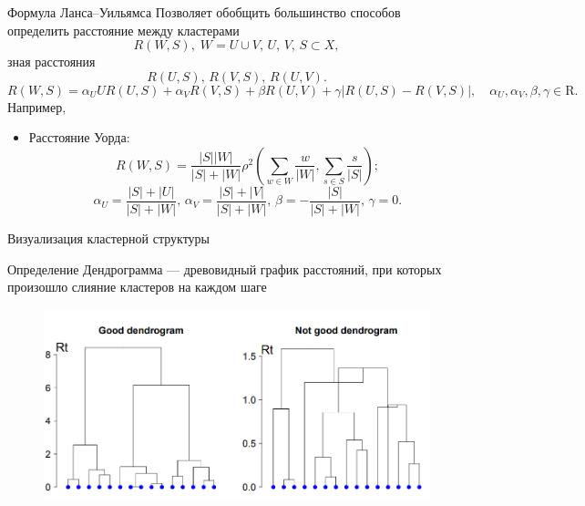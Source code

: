 \documentclass{beamer}
\begin{document}
\begin{frame}{Формула Ланса--Уильямса}
    Позволяет обобщить большинство способов определить расстояние между кластерами
    \begin{equation*}
        R(W, S),\; W = U \cup V,\, U,\, V,\, S \subset X,
    \end{equation*}
зная расстояния
\begin{equation*}
        R(U, S),\, R(V, S),\, R(U, V).
    \end{equation*}
\begin{equation*}
    R(W, S) = \alpha_{U}U R(U, S) + \alpha_{V} R(V, S) + \beta R(U, V) + \gamma|R(U, S) − R(V, S)|,\quad \alpha_{U}, \alpha_{V} , \beta, \gamma \in \mathrm{R}.
\end{equation*}
\vspace{2\ex}
Например,
\begin{itemize}
    \item Расстояние Уорда:
\begin{equation*}
R(W, S) = \frac{|S||W|}{|S|+|W|}\rho^{2}\left(\sum\limits_{w\in W}\frac{w}{|W|}, \sum\limits_{s\in S}\frac{s}{|S|}\right);
\end{equation*}
\begin{equation*}
\alpha_U = \frac{|S|+|U|}{|S|+|W|},\, \alpha_V = \frac{|S|+|V|}{|S|+|W|},\, \beta = -\frac{|S|}{|S|+|W|},\, \gamma = 0.
\end{equation*}
\end{itemize}
\end{frame}

\begin{frame}{Визуализация кластерной структуры}
   \begin{block}{Определение}
   Дендрограмма --- древовидный график расстояний, при которых произошло слияние кластеров на каждом шаге
   \end{block}
   \begin{figure}
   \vspace{-2ex}
   \begin{center}
   \includegraphics[scale = 0.4]{dendrogram.png}
   \end{center}
   \end{figure}
\end{frame}
\end{document}
